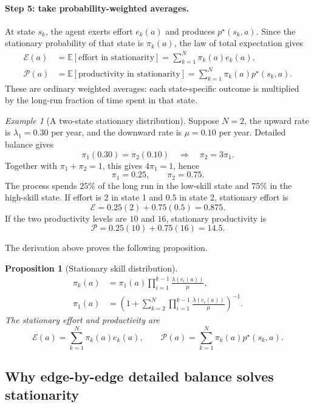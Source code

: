 \documentclass[11pt]{article}
\theoremstyle{tutorial}
\newtheorem{proposition}[theorem]{Proposition}
\theoremstyle{remark}
\newtheorem{example}[theorem]{Example}
\newcommand{\E}{\mathbb{E}}
\newcommand{\1}{\mathbb{I}}
\newcommand{\calP}{\mathcal{P}}
\newcommand{\calE}{\mathcal{E}}
\begin{document}
\paragraph{Step 5: take probability-weighted averages.}
At state $s_k$, the agent exerts effort $e_k(a)$ and produces $p^\star(s_k,a)$.  Since the stationary
probability of that state is $\pi_k(a)$, the law of total expectation gives
\begin{align*}
\calE(a)
&=\E[\text{effort in stationarity}]
=\sum_{k=1}^N\pi_k(a)e_k(a),\\
\calP(a)
&=\E[\text{productivity in stationarity}]
=\sum_{k=1}^N\pi_k(a)p^\star(s_k,a).
\end{align*}
These are ordinary weighted averages: each state-specific outcome is multiplied by the long-run fraction of
time spent in that state.

\begin{example}[A two-state stationary distribution]
Suppose $N=2$, the upward rate is $\lambda_1=0.30$ per year, and the downward rate is $\mu=0.10$ per
year.  Detailed balance gives
\[
  \pi_1(0.30)=\pi_2(0.10)
  \quad\Longrightarrow\quad
  \pi_2=3\pi_1.
\]
Together with $\pi_1+\pi_2=1$, this gives $4\pi_1=1$, hence
\[
  \pi_1=0.25,
  \qquad
  \pi_2=0.75.
\]
The process spends $25\%$ of the long run in the low-skill state and $75\%$ in the high-skill state.  If
effort is $2$ in state 1 and $0.5$ in state 2, stationary effort is
\[
  \calE=0.25(2)+0.75(0.5)=0.875.
\]
If the two productivity levels are $10$ and $16$, stationary productivity is
\[
  \calP=0.25(10)+0.75(16)=14.5.
\]
\end{example}

The derivation above proves the following proposition.
\begin{proposition}[Stationary skill distribution]
\begin{align*}
  \pi_k(a)&=\pi_1(a)\prod_{i=1}^{k-1}\frac{\lambda(e_i(a))}{\mu},\\
  \pi_1(a)&=\left(1+\sum_{k=2}^{N}\prod_{i=1}^{k-1}
             \frac{\lambda(e_i(a))}{\mu}\right)^{-1}.
\end{align*}
The stationary effort and productivity are
\[
  \calE(a)=\sum_{k=1}^N\pi_k(a)e_k(a),
  \qquad
  \calP(a)=\sum_{k=1}^N\pi_k(a)p^\star(s_k,a).
\]
\end{proposition}

\subsection{Why edge-by-edge detailed balance solves stationarity}
\end{document}
